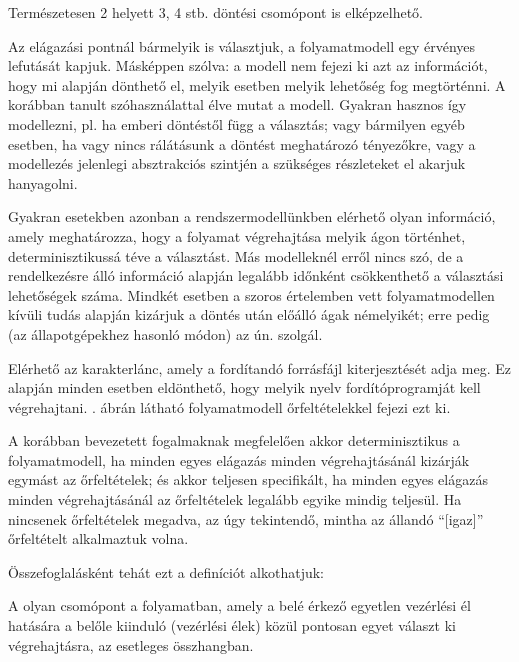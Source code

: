 Természetesen 2 helyett 3, 4 stb.  döntési csomópont is elképzelhető.

Az elágazási pontnál bármelyik  is választjuk, a folyamatmodell egy érvényes lefutását kapjuk. Másképpen szólva: a modell nem fejezi ki azt az információt, hogy mi alapján dönthető el, melyik esetben melyik lehetőség fog megtörténni. A korábban tanult szóhasználattal élve  mutat a modell. Gyakran hasznos így modellezni, pl. ha emberi döntéstől függ a választás; vagy bármilyen egyéb esetben, ha vagy nincs rálátásunk a döntést meghatározó tényezőkre, vagy a modellezés jelenlegi absztrakciós szintjén a szükséges részleteket el akarjuk hanyagolni. 

Gyakran esetekben azonban a rendszermodellünkben elérhető olyan információ, amely meghatározza, hogy a folyamat végrehajtása melyik ágon történhet, determinisztikussá téve a választást. Más modelleknél erről nincs szó, de a rendelkezésre álló információ alapján legalább időnként csökkenthető a választási lehetőségek száma. Mindkét esetben a szoros értelemben vett folyamatmodellen kívüli tudás alapján kizárjuk a döntés után előálló ágak némelyikét; erre pedig (az állapotgépekhez hasonló módon) az ún.  szolgál. 

\begin{pelda}
Elérhető az  karakterlánc, amely a fordítandó forrásfájl kiterjesztését adja meg. Ez alapján minden esetben eldönthető, hogy melyik nyelv fordítóprogramját kell végrehajtani. . ábrán látható folyamatmodell őrfeltételekkel fejezi ezt ki.
\end{pelda}


A korábban bevezetett fogalmaknak megfelelően akkor determinisztikus a folyamatmodell, ha minden egyes elágazás minden végrehajtásánál kizárják egymást az őrfeltételek; és akkor teljesen specifikált, ha minden egyes elágazás minden végrehajtásánál az őrfeltételek legalább egyike mindig teljesül. Ha nincsenek őrfeltételek megadva, az úgy tekintendő, mintha az állandó ``[igaz]'' őrfeltételt alkalmaztuk volna.

Összefoglalásként tehát ezt a definíciót alkothatjuk:

\begin{definicio}
	A  olyan csomópont a folyamatban, amely a belé érkező egyetlen vezérlési él hatására a belőle kiinduló  (vezérlési élek) közül pontosan egyet választ ki végrehajtásra, az esetleges  összhangban.
\end{definicio}



